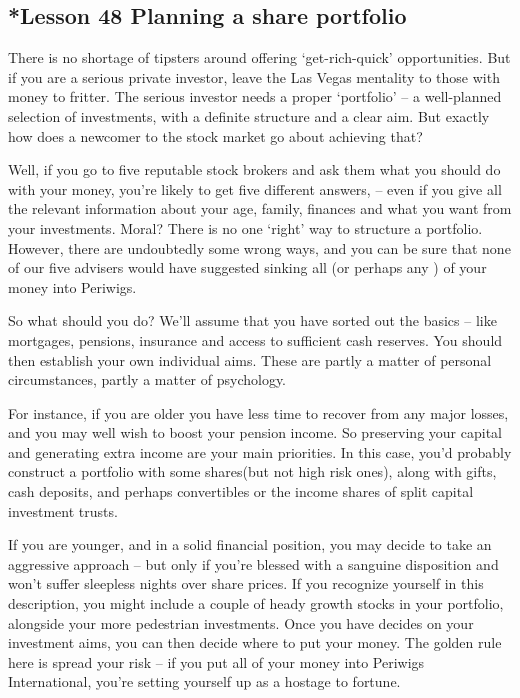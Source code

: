 \documentclass[kindlepaper]{BHCexam4kindle}
\begin{document}
\subsection{*Lesson 48 Planning a share portfolio}
\par
There is no shortage of tipsters around offering ‘get-rich-quick' opportunities. But if you are a serious private
investor, leave the Las Vegas mentality to those with money to fritter. The serious investor needs a proper
‘portfolio' – a well-planned selection of investments, with a definite structure and a clear aim. But exactly how
does a newcomer to the stock market go about achieving that?
\par
Well, if you go to five reputable stock brokers and ask them what you should do with your money, you're
likely to get five different answers, -- even if you give all the relevant information about your age, family,
finances and what you want from your investments. Moral? There is no one ‘right' way to structure a portfolio.
However, there are undoubtedly some wrong ways, and you can be sure that none of our five advisers would
have suggested sinking all (or perhaps any ) of your money into Periwigs.
\par
So what should you do? We'll assume that you have sorted out the basics – like mortgages, pensions,
insurance and access to sufficient cash reserves. You should then establish your own individual aims. These are
partly a matter of personal circumstances, partly a matter of psychology.
\par
For instance, if you are older you have less time to recover from any major losses, and you may well wish
to boost your pension income. So preserving your capital and generating extra income are your main priorities.
In this case, you'd probably construct a portfolio with some shares(but not high risk ones), along with gifts,
cash deposits, and perhaps convertibles or the income shares of split capital investment trusts.
\par
If you are younger, and in a solid financial position, you may decide to take an aggressive approach – but
only if you're blessed with a sanguine disposition and won't suffer sleepless nights over share prices. If you
recognize yourself in this description, you might include a couple of heady growth stocks in your portfolio,
alongside your more pedestrian investments. Once you have decides on your investment aims, you can then
decide where to put your money. The golden rule here is spread your risk – if you put all of your money into
Periwigs International, you're setting yourself up as a hostage to fortune.
\clearpage
\end{document}
